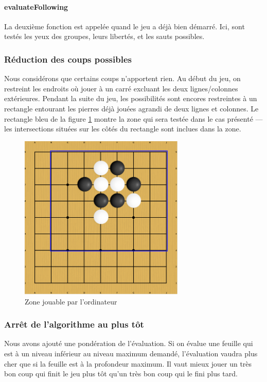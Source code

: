 \documentclass[11pt,a4paper,titlepage,french]{article}
\begin{document}
				\paragraph{evaluateFollowing}
					La deuxième fonction est appelée quand le jeu a déjà bien démarré. Ici, sont testés les yeux des groupes, leurs libertés, et les sauts possibles.

			\subsubsection{Réduction des coups possibles}
				Nous considérons que certains coups n'apportent rien. Au début du jeu, on restreint les endroits où jouer à un carré excluant les deux lignes/colonnes extérieures. Pendant la suite du jeu, les possibilités  sont encores restreintes à un rectangle entourant les pierres déjà jouées agrandi de deux lignes et colonnes. Le rectangle bleu de la figure \ref{rectangletest} montre la zone qui sera testée dans le cas présenté --- les intersections situées sur les côtés du rectangle sont inclues dans la zone.

				\begin{figure}[hbt]
					\begin{center}
						\includegraphics[width=0.7\textwidth]{./rectangle-test.png}
					\end{center}
					\caption{Zone jouable par l'ordinateur}
					\label{rectangletest}
				\end{figure}


			\subsubsection{Arrêt de l'algorithme au plus tôt}
				Nous avons ajouté une pondération de l'évaluation. Si on évalue une feuille qui est à un niveau inférieur au niveau maximum demandé, l'évaluation vaudra plus cher que si la feuille est à la profondeur maximum. Il vaut mieux jouer un très bon coup qui finit le jeu plus tôt qu'un très bon coup qui le fini plus tard.
\end{document}
